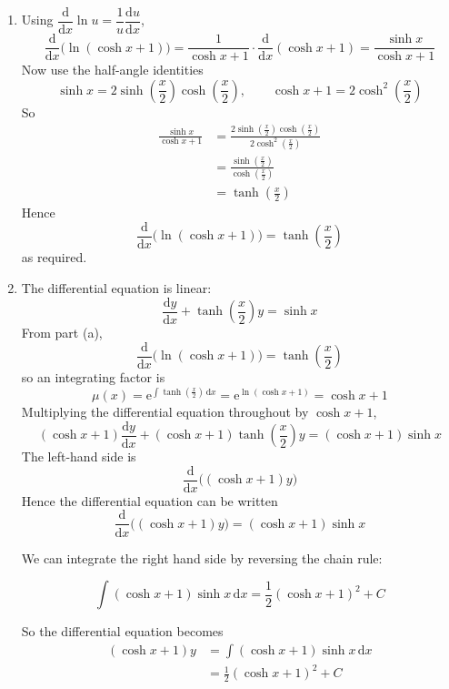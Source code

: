 \documentclass[leqno]{article}
\begin{document}
\begin{enumerate}[
  label=\textbf{\arabic*.},
  leftmargin=*,
  topsep=0pt,
  partopsep=0pt,
  parsep=0pt
]
\vspace*{30pt}

\begin{tcolorbox}[colback=white, colframe=scarlet, title={\textbf{Solution}}, breakable, grow to left by=6mm, grow to right by=10mm]
\begin{enumerate}[label=\textbf{(\alph*)}]
  \item Using \(\dfrac{\mathrm{d}}{\mathrm{d}x}\ln u=\dfrac{1}{u}\dfrac{\mathrm{d}u}{\mathrm{d}x}\),
\[
\frac{\mathrm{d}}{\mathrm{d}x}\bigl(\ln(\cosh x+1)\bigr)
=\frac{1}{\cosh x+1}\cdot \frac{\mathrm{d}}{\mathrm{d}x}(\cosh x+1)
=\frac{\sinh x}{\cosh x+1}
\]
Now use the half-angle identities
\[
\sinh x=2\sinh\left(\frac{x}{2}\right)\cosh\left(\frac{x}{2}\right),
\qquad
\cosh x+1=2\cosh^2\left(\frac{x}{2}\right)
\]
So
\begin{align*}
\frac{\sinh x}{\cosh x+1}
&=\frac{2\sinh\left(\frac{x}{2}\right)\cosh\left(\frac{x}{2}\right)}{2\cosh^2\left(\frac{x}{2}\right)} \\
&=\frac{\sinh\left(\frac{x}{2}\right)}{\cosh\left(\frac{x}{2}\right)} \\
&=\tanh\left(\frac{x}{2}\right)
\end{align*}
Hence
\[
\frac{\mathrm{d}}{\mathrm{d}x}\bigl(\ln(\cosh x+1)\bigr)=\tanh\left(\frac{x}{2}\right)
\]
as required.

  \item The differential equation is linear:
\[
\frac{\mathrm{d}y}{\mathrm{d}x}+\tanh\left(\frac{x}{2}\right)y=\sinh x
\]
From part (a),
\[
\frac{\mathrm{d}}{\mathrm{d}x}\bigl(\ln(\cosh x+1)\bigr)=\tanh\left(\frac{x}{2}\right)
\]
so an integrating factor is
\[
\mu(x)=\mathrm{e}^{\int \tanh\left(\frac{x}{2}\right)\,\mathrm{d}x}
=\mathrm{e}^{\ln(\cosh x+1)}
=\cosh x+1
\]
Multiplying the differential equation throughout by \(\cosh x+1\),
\[
(\cosh x+1)\frac{\mathrm{d}y}{\mathrm{d}x}+(\cosh x+1)\tanh\left(\frac{x}{2}\right)y=(\cosh x+1)\sinh x
\]
The left-hand side is
\[
\frac{\mathrm{d}}{\mathrm{d}x}\bigl((\cosh x+1)y\bigr)
\]
Hence the differential equation can be written
\[
\frac{\mathrm{d}}{\mathrm{d}x}\bigl((\cosh x+1)y\bigr)=(\cosh x+1)\sinh x
\]

We can integrate the right hand side by reversing the chain rule:

\[\int (\cosh x+1)\sinh x \,\mathrm{d}x
=\frac{1}{2}(\cosh x+1)^2+C\]

So the differential equation becomes
\begin{align*}
(\cosh x+1)y
&=\int (\cosh x+1)\sinh x \,\mathrm{d}x\\[8pt]
&=\frac{1}{2}(\cosh x+1)^2+C
\end{align*}


\end{enumerate}
\end{tcolorbox}
\end{enumerate}
\end{document}
